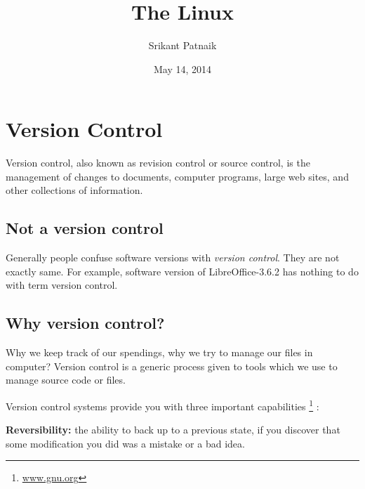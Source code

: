 \documentclass[letterpaper,10pt,english]{sphinxmanual}
\title{The Linux}
\date{May 14, 2014}
\author{Srikant Patnaik}
\begin{document}
\maketitle
\tableofcontents
{}\label{index::doc}



\part{Version Control}
\label{version-control:version-control}\label{version-control::doc}
Version control, also known as revision control or source control, is the
management of changes to documents, computer programs, large web sites,
and other collections of information.

\begin{DUlineblock}{0em}
\item[] 
\end{DUlineblock}


\chapter{Not a version control}
\label{version-control:not-a-version-control}
Generally people confuse software versions with \emph{version control}. They are not
exactly same. For example, software version of LibreOffice-3.6.2 has nothing
to do with term version control.

\begin{DUlineblock}{0em}
\item[] 
\item[] 
\end{DUlineblock}


\chapter{Why version control?}
\label{version-control:why-version-control}
Why we keep track of our spendings, why we try to manage our files in computer?
Version control is a generic process given to tools which we use to manage
source code or files.

Version control systems provide you with three important capabilities \footnote{
\href{http://www.gnu.org/software/emacs/manual/html\_node/emacs/Why-Version-Control\_003f.html\#Why-Version-Control\_003f}{www.gnu.org}
} :

\textbf{Reversibility:} the ability to back up to a previous state, if you discover
that some modification you did was a mistake or a bad idea.
\end{document}
